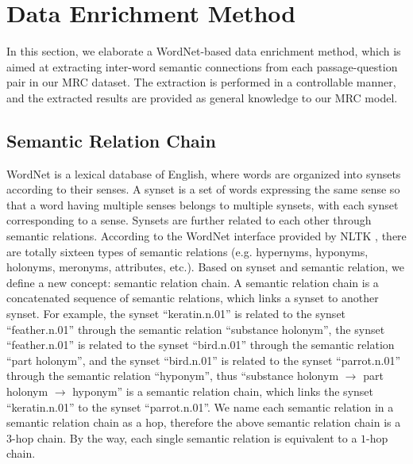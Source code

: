 \documentclass[11pt,a4paper]{article}
\begin{document}
\section{Data Enrichment Method}
In this section, we elaborate a WordNet-based data enrichment method, which is aimed at extracting inter-word semantic connections from each passage-question pair in our MRC dataset. The extraction is performed in a controllable manner, and the extracted results are provided as general knowledge to our MRC model.

\subsection{Semantic Relation Chain}
WordNet is a lexical database of English, where words are organized into synsets according to their senses. A synset is a set of words expressing the same sense so that a word having multiple senses belongs to multiple synsets, with each synset corresponding to a sense. Synsets are further related to each other through semantic relations. According to the WordNet interface provided by NLTK \cite{birdsteven:2004}, there are totally sixteen types of semantic relations (e.g. hypernyms, hyponyms, holonyms, meronyms, attributes, etc.). Based on synset and semantic relation, we define a new concept: semantic relation chain. A semantic relation chain is a concatenated sequence of semantic relations, which links a synset to another synset. For example, the synset ``keratin.n.01'' is related to the synset ``feather.n.01'' through the semantic relation ``substance holonym'', the synset ``feather.n.01'' is related to the synset ``bird.n.01'' through the semantic relation ``part holonym'', and the synset ``bird.n.01'' is related to the synset ``parrot.n.01'' through the semantic relation ``hyponym'', thus ``substance holonym $\to$ part holonym $\to$ hyponym'' is a semantic relation chain, which links the synset ``keratin.n.01'' to the synset ``parrot.n.01''. We name each semantic relation in a semantic relation chain as a hop, therefore the above semantic relation chain is a $3$-hop chain. By the way, each single semantic relation is equivalent to a $1$-hop chain.
\end{document}
